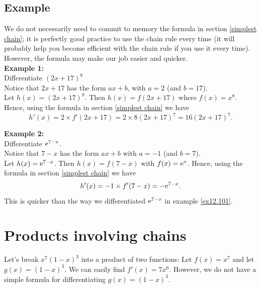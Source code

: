   	\bigskip
	
	\hfil{}
	\bigskip
	
\subsection{Example}
We do not necessarily need to commit to memory the formula in section \ref{simplest chain}; it is perfectly good practice to use the chain rule every time (it will probably help you become efficient with the chain rule if you use it every time). However, the formula may make our job easier and quicker. \\

\noindent \textbf{Example 1:} \\
\noindent Differentiate $(2x+17)^8$ \\

\solution
Notice that $2x+17$ has the form $ax+b$, with $a = 2$ (and $b = 17$).  \\

\noindent Let $h(x) = (2x+17)^8$. Then $h(x) = f(2x+17)$ where $f(x) = x^8$. Hence, using the formula in section \ref{simplest chain} we have
\[
h'(x) = 2\times f'(2x+17) = 2\times8(2x+17)^7 = 16(2x+17)^7.
\]

\noindent \textbf{Example 2:} \\
\noindent Differentiate $\mathrm{e}^{7-x}$. \\

\solution
Notice that $7-x$ has the form $ax+b$ with $a = -1$ (and $b = 7$). \\

\noindent Let $h(x) = \mathrm{e}^{7-x}$. Then $h(x) = f(7-x)$ with $f(x) = \mathrm{e}^x$. Hence, using the formula in section \ref{simplest chain} we have
\[
h'(x) = -1\times f'(7-x) = -\mathrm{e}^{7-x}.
\]
This is quicker than the way we differentiated $\mathrm{e}^{7-x}$ in example \ref{ex12.101}.

\section{Products involving chains}
Let's break $x^7(1-x)^3$ into a product of two functions: Let $f(x) = x^7$ and let $g(x) = (1-x)^3$. We can easily find $f'(x) = 7x^6$. However, we do not have a simple formula for differentiating $g(x) = (1-x)^3$. \\


